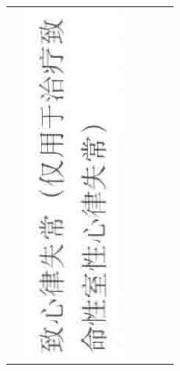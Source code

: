 \documentclass[10pt]{article}
\begin{document}
\begin{center}
\begin{tabular}{|c|c|c|c|c|c|}
 & \includegraphics[max width=\textwidth]{2024_07_05_645bb794a4d4f32ee0c8g-352(14)}

\end{tabular}
\end{center}
\end{document}
